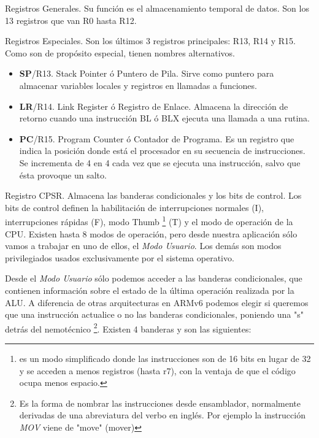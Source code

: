 \begin{descript}
  \item[Registros Generales.]
    Su función es el almacenamiento temporal de datos. Son los 13 registros
    que van R0 hasta R12.
  \item[Registros Especiales.]
    Son los últimos 3 registros principales: R13, R14 y R15. Como son de
    propósito especial, tienen nombres alternativos.

    \begin{itemize}
      \item{\textbf{SP}/R13. Stack Pointer ó Puntero de Pila. Sirve como puntero para almacenar
        variables locales y registros en llamadas a funciones.}
      \item{\textbf{LR}/R14. Link Register ó Registro de Enlace. Almacena la dirección de retorno
        cuando una instrucción BL ó BLX ejecuta una llamada a una rutina.}
      \item{\textbf{PC}/R15. Program Counter ó Contador de Programa. Es un registro que indica
        la posición donde está el procesador en su secuencia de instrucciones. Se
        incrementa de 4 en 4 cada vez que se ejecuta una instrucción, salvo que ésta
        provoque un salto.}
    \end{itemize}

  \item[Registro CPSR.]
        Almacena las banderas condicionales y los bits de control. Los bits de control
        definen la habilitación de interrupciones normales (I),
        interrupciones rápidas (F), modo Thumb \footnote{es un modo simplificado donde las
        instrucciones son de 16 bits en lugar de 32 y se acceden a menos registros (hasta r7),
        con la ventaja de que el código ocupa menos espacio.} (T) y el modo de operación
        de la CPU. Existen hasta 8 modos de operación, pero desde nuestra aplicación
        sólo vamos a trabajar en uno de ellos, el {\it Modo Usuario}. Los demás son modos
        privilegiados usados exclusivamente por el sistema operativo.

        Desde el {\it Modo Usuario} sólo podemos acceder a las banderas condicionales, que
        contienen información sobre el estado de la última operación realizada por la ALU.
        A diferencia de otras arquitecturas en ARMv6 podemos elegir si queremos que una
        instrucción actualice o no las banderas condicionales, poniendo una "s" detrás
        del nemotécnico \footnote{Es la forma de nombrar las instrucciones desde
        ensamblador, normalmente derivadas de una abreviatura del verbo en inglés. Por
        ejemplo la instrucción {\it MOV} viene de "move" (mover) }. Existen 4 banderas
        y son las siguientes:


\end{descript}
